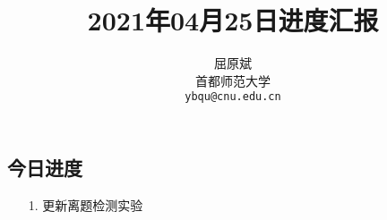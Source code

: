 \documentclass[11pt]{article}
\title{2021年04月25日进度汇报}
\author{屈原斌 \\
  首都师范大学 \\
    {\tt ybqu@cnu.edu.cn}}
\date{}
\begin{document}
\begin{CJK}{UTF8}{gkai}

\maketitle
\CJKindent


\section{今日进度}


\begin{itemize}
  \item [1.] 更新离题检测实验
\end{itemize}


\end{CJK}
\end{document}
